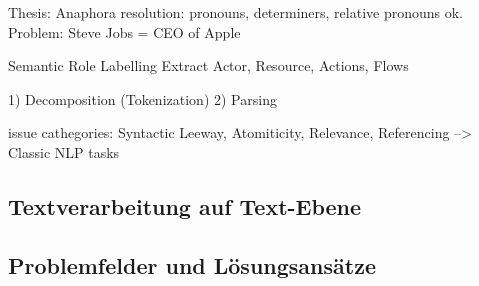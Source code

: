 Thesis:
Anaphora resolution:
pronouns, determiners, relative pronouns ok. Problem: Steve Jobs = CEO of Apple

Semantic Role Labelling
Extract Actor, Resource, Actions, Flows

1) Decomposition (Tokenization)
2) Parsing

issue cathegories: Syntactic Leeway, Atomiticity, Relevance, Referencing
--> Classic NLP tasks

\subsection{Textverarbeitung auf Text-Ebene}
\subsection{Problemfelder und Lösungsansätze}



